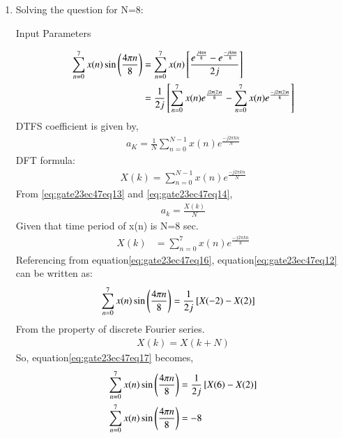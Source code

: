 \documentclass[journal,12pt,onecolumn]{IEEEtran}
\theoremstyle{remark}
\begin{document}
\begin{enumerate}
\item Solving the question for N=8:
\begin{table}[h]
 	\centering
 	\resizebox{6 cm}{!}{
 		
 	}
 	\vspace{6 pt}
 	\caption{Input Parameters}
 	\label{eq:gate23ec47tab1}
 \end{table} 
\begin{align}
\sum\limits_{n=0}^{7}x(n) \sin\left(\frac{4\pi n}{8}\right)&=\sum\limits_{n=0}^{7}x(n){}\left[\frac{e^{\frac{j4\pi n}{8}}-e^{\frac{-j4\pi n}{8}}}{2j}\right]\\
&=\frac{1}{2j}{}\left[\sum\limits_{n=0}^{7}x(n)e^{\frac{j2\pi (2)n}{8}}-\sum\limits_{n=0}^{7}x(n)e^{\frac{-j2\pi (2)n}{8}}\right]\label{eq:gate23ec47eq12}
\end{align}
DTFS coefficient is given by,\\
\begin{align}
a_K=\frac{1}{N}\sum\limits_{n=0}^{N-1} x(n)e^{\frac{-j2\pi kn}{N}}\label{eq:gate23ec47eq13}
\end{align}DFT formula:
\begin{align}
X(k)=\sum\limits_{n=0}^{N-1} x(n)e^{\frac{-j2\pi kn}{N}}\label{eq:gate23ec47eq14}
\end{align}
From \eqref{eq:gate23ec47eq13} and \eqref{eq:gate23ec47eq14},
\begin{align}
a_k=\frac{X(k)}{N}
\end{align}
Given that time period of x(n) is N=8 sec.\\
\begin{align}
X(k)&=\sum\limits_{n=0}^{7} x(n)e^{\frac{-j2\pi kn}{8}}\label{eq:gate23ec47eq16}
\end{align}
Referencing from equation\eqref{eq:gate23ec47eq16}, equation\eqref{eq:gate23ec47eq12} can be written as:
\begin{align}
\sum\limits_{n=0}^{7}x(n) \sin\left(\frac{4\pi n}{8}\right)&=\frac{1}{2j}{}\left[X(-2)-X(2)\right]\label{eq:gate23ec47eq17}
\end{align}
From the property of discrete Fourier series.\\
\begin{align}
X(k)=X(k+N)
\end{align}
So, equation\eqref{eq:gate23ec47eq17} becomes,\\
\begin{align}
\sum\limits_{n=0}^{7}x(n) \sin\left(\frac{4\pi n}{8}\right)&=\frac{1}{2j}{}\left[X(6)-X(2)\right]\\
\sum\limits_{n=0}^{7}x(n) \sin\left(\frac{4\pi n}{8}\right)&=-8
\end{align}


\end{enumerate}
\end{document}

